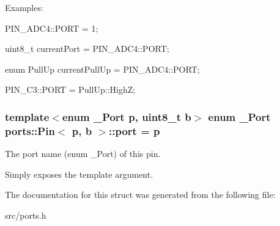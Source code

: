 Examples\+:


\begin{DoxyItemize}
\item {\ttfamily P\+I\+N\+\_\+\+A\+D\+C4\+::\+P\+O\+RT = 1;}
\item {\ttfamily uint8\+\_\+t current\+Port = P\+I\+N\+\_\+\+A\+D\+C4\+::\+P\+O\+RT;}
\item {\ttfamily enum Pull\+Up current\+Pull\+Up = P\+I\+N\+\_\+\+A\+D\+C4\+::\+P\+O\+RT;}
\item {\ttfamily P\+I\+N\+\_\+\+C3\+::\+P\+O\+RT = Pull\+Up\+::\+HighZ;} 
\end{DoxyItemize}
\subsubsection[{\texorpdfstring{port}{port}}]{\setlength{\rightskip}{0pt plus 5cm}template$<$enum \+\_\+\+Port p, uint8\+\_\+t b$>$ enum {\bf \+\_\+\+Port} {\bf ports\+::\+Pin}$<$ p, b $>$\+::port = p\hspace{0.3cm}{\ttfamily [static]}}\hypertarget{structports_1_1Pin_ad63613b8c14441d28e3f3d935da67e77}{}\label{structports_1_1Pin_ad63613b8c14441d28e3f3d935da67e77}


The port name (enum \+\_\+\+Port) of this pin. 

Simply exposes the template argument. 

The documentation for this struct was generated from the following file\+:\begin{DoxyCompactItemize}
\item 
src/ports.\+h\end{DoxyCompactItemize}
